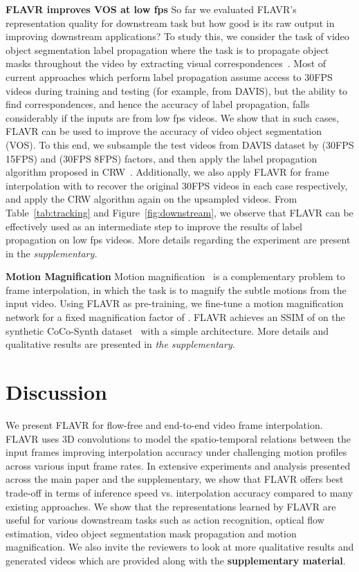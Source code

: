 \documentclass[10pt,twocolumn,letterpaper]{article}
\newcommand{\figref}[1]{Figure~\ref{#1}}
\newcommand{\tabref}[1]{Table~\ref{#1}}
\newcommand{\red}[1]{{#1}}
\newcommand{\Ours}{FLAVR}
\newcommand{\twox}{}
\newcommand{\fourx}{}
\begin{document}
\begin{table*}[!t]
{\bf \Ours{} improves VOS at low fps} \red{ So far we evaluated \Ours{}'s representation quality for downstream task but how good is its raw output in improving downstream applications? To study this, we consider the task of video object segmentation label propagation where the task is to propagate object masks throughout the video by extracting visual correspondences~\cite{jabri2020space, wang2019learning, xu2021rethinking, li2019joint}. Most of current approaches which perform label propagation assume access to 30FPS videos during training and testing (for example, from DAVIS), but the ability to find correspondences, and hence the accuracy of label propagation, falls considerably if the inputs are from low fps videos. We show that in such cases, \Ours{} can be used to improve the accuracy of video object segmentation (VOS). To this end, we subsample the test videos from DAVIS dataset by \twox{} (30FPS  15FPS) and \fourx{} (30FPS  8FPS) factors, and then apply the label propagation algorithm proposed in CRW~\cite{jabri2020space}. Additionally, we also apply \Ours{} for frame interpolation with  to recover the original 30FPS videos in each case respectively, and apply the CRW algorithm again on the upsampled videos. From \tabref{tab:tracking} and \figref{fig:downstream}, we observe that \Ours{} can be effectively used as an intermediate step to improve the results of label propagation on low fps videos. More details regarding the experiment are present in the \em{supplementary}.}

{\bf Motion Magnification} Motion magnification~\cite{wu2012eulerian, oh2018learning} is a complementary problem to frame interpolation, in which the task is to magnify the subtle motions from the input video. Using \Ours{} as pre-training, we fine-tune a motion magnification network for a fixed magnification factor of . 
\Ours{} achieves an SSIM of  on the synthetic CoCo-Synth dataset~\cite{oh2018learning} with a simple architecture.
More details and qualitative results are presented in {\em the supplementary}.

\vspace{-5pt}
\section{Discussion}
\label{sec:conclusion}

We present \Ours{} for flow-free and end-to-end video frame interpolation. \Ours{} uses 3D convolutions to model the spatio-temporal relations between the input frames improving interpolation accuracy under challenging motion profiles across various input frame rates. In extensive experiments and analysis presented across the main paper and the supplementary, we show that \Ours{} offers best trade-off in terms of inference speed vs. interpolation accuracy compared to many existing approaches. We show that the representations learned by \Ours{} are useful for various downstream tasks such as action recognition, optical flow estimation, video object segmentation mask propagation and motion magnification. We also invite the reviewers to look at more qualitative results and generated videos which are provided along with the \textbf{supplementary material}.


\end{table*}
\end{document}
